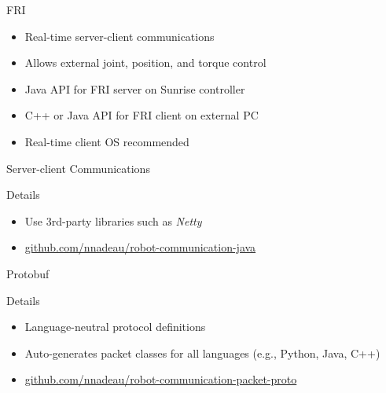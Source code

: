 \documentclass{beamer}
\begin{document}
\begin{frame}{FRI}
  \begin{itemize}
    \item Real-time server-client communications
    \item Allows external joint, position, and torque control
    \item Java API for FRI server on Sunrise controller
    \item C++ or Java API for FRI client on external PC
    \item Real-time client OS recommended
  \end{itemize}
\end{frame}

\begin{frame}[fragile]{Server-client Communications}

  \begin{block}{Details}
    \begin{itemize}
      \item Use 3rd-party libraries such as \textit{Netty}
      \item \small\url{github.com/nnadeau/robot-communication-java}
    \end{itemize}
  \end{block}
\end{frame}

\begin{frame}[fragile]{Protobuf}

  \begin{block}{Details}
    \begin{itemize}
      \item Language-neutral protocol definitions
      \item Auto-generates packet classes for all languages (e.g., Python, Java, C++)
      \item \small\url{github.com/nnadeau/robot-communication-packet-proto}
    \end{itemize}
  \end{block}
\end{frame}
\end{document}

